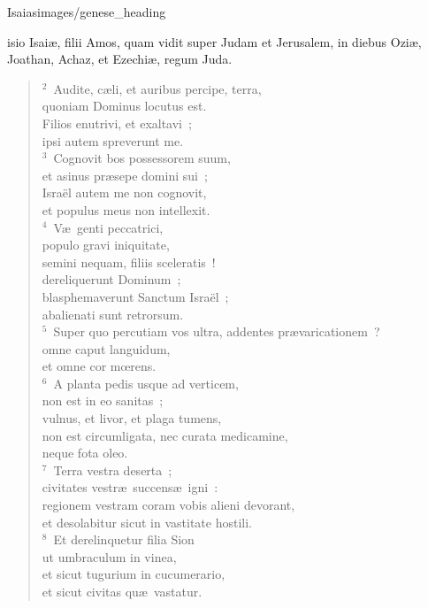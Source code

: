 {Isaias}{images/genese_heading}


\bchapter
{}isio Isai\ae , filii Amos, quam vidit super Judam et Jerusalem, in diebus Ozi\ae , Joathan, Achaz, et Ezechi\ae , regum Juda.


\begin{verse}${}^{2}$~Audite, c\ae li, et auribus percipe, terra,\\ quoniam Dominus locutus est.\\ Filios enutrivi, et exaltavi~;\\ ipsi autem spreverunt me.\\
${}^{3}$~Cognovit bos possessorem suum,\\ et asinus pr\ae sepe domini sui~;\\ Isra\"el autem me non cognovit,\\ et populus meus non intellexit.\\
${}^{4}$~V\ae\ genti peccatrici,\\ populo gravi iniquitate,\\ semini nequam, filiis sceleratis~!\\ dereliquerunt Dominum~;\\ blasphemaverunt Sanctum Isra\"el~;\\ abalienati sunt retrorsum.\\
${}^{5}$~Super quo percutiam vos ultra, addentes pr\ae varicationem~?\\ omne caput languidum,\\ et omne cor mœrens.\\
${}^{6}$~A planta pedis usque ad verticem,\\ non est in eo sanitas~;\\ vulnus, et livor, et plaga tumens,\\ non est circumligata, nec curata medicamine,\\ neque fota oleo.\\
${}^{7}$~Terra vestra deserta~;\\ civitates vestr\ae\ succens\ae\ igni~:\\ regionem vestram coram vobis alieni devorant,\\ et desolabitur sicut in vastitate hostili.\\
${}^{8}$~Et derelinquetur filia Sion\\ ut umbraculum in vinea,\\ et sicut tugurium in cucumerario,\\ et sicut civitas qu\ae\ vastatur.\\

\end{verse}
